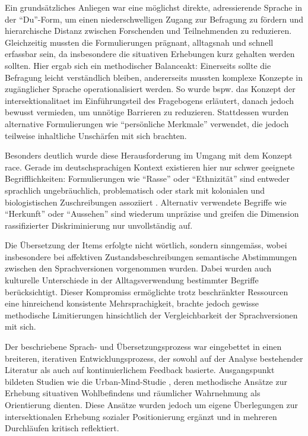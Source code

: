 Ein grundsätzliches Anliegen war eine möglichst direkte, adressierende Sprache in der \enquote{Du}-Form, um einen niederschwelligen Zugang zur Befragung zu fördern und hierarchische Distanz zwischen Forschenden und Teilnehmenden zu reduzieren. Gleichzeitig mussten die Formulierungen prägnant, alltagsnah und schnell erfassbar sein, da insbesondere die situativen Erhebungen kurz gehalten werden sollten. Hier ergab sich ein methodischer Balanceakt: Einerseits sollte die Befragung leicht verständlich bleiben, andererseits mussten komplexe Konzepte in zugänglicher Sprache operationalisiert werden. So wurde bspw. das Konzept der \gls{intersektionalitaet} im Einführungsteil des Fragebogens erläutert, danach jedoch bewusst vermieden, um unnötige Barrieren zu reduzieren. Stattdessen wurden alternative Formulierungen wie \enquote{persönliche Merkmale} verwendet, die jedoch teilweise inhaltliche Unschärfen mit sich brachten. 

Besonders deutlich wurde diese Herausforderung im Umgang mit dem Konzept \gls{race}. Gerade im deutschsprachigen Kontext existieren hier nur schwer geeignete Begrifflichkeiten: Formulierungen wie \enquote{Rasse} oder \enquote{Ethnizität} sind entweder sprachlich ungebräuchlich, problematisch oder stark mit kolonialen und biologistischen Zuschreibungen assoziiert \parencite[\gls{vgl}][]{roigIntersectionalityEuropeDepoliticized2018}. Alternativ verwendete Begriffe wie \enquote{Herkunft} oder \enquote{Aussehen} sind wiederum unpräzise und greifen die Dimension rassifizierter Diskriminierung nur unvollständig auf.

Die Übersetzung der Items erfolgte nicht wörtlich, sondern sinngemäss, wobei insbesondere bei affektiven Zustandsbeschreibungen semantische Abstimmungen zwischen den Sprachversionen vorgenommen wurden. Dabei wurden auch kulturelle Unterschiede in der Alltagsverwendung bestimmter Begriffe berücksichtigt. Dieser Kompromiss ermöglichte trotz beschränkter Ressourcen eine hinreichend konsistente Mehrsprachigkeit, brachte jedoch gewisse methodische Limitierungen hinsichtlich der Vergleichbarkeit der Sprachversionen mit sich.

Der beschriebene Sprach- und Übersetzungsprozess war eingebettet in einen breiteren, iterativen Entwicklungsprozess, der sowohl auf der Analyse bestehender Literatur als auch auf kontinuierlichem Feedback basierte. Ausgangspunkt bildeten Studien wie die Urban-Mind-Studie \parencite{bakolisUrbanMindUsing2018}, deren methodische Ansätze zur Erhebung situativen Wohlbefindens und räumlicher Wahrnehmung als Orientierung dienten. Diese Ansätze wurden jedoch um eigene Überlegungen zur intersektionalen Erhebung sozialer Positionierung ergänzt und in mehreren Durchläufen kritisch reflektiert.

